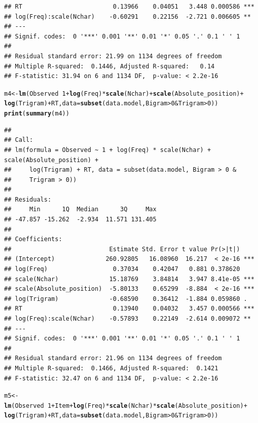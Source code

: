 \documentclass{article}\usepackage[]{graphicx}\usepackage[]{color}
\makeatletter
\newcommand{\hlnum}[1]{\textcolor[rgb]{0.686,0.059,0.569}{#1}}%
\newcommand{\hlopt}[1]{\textcolor[rgb]{0,0,0}{#1}}%
\newcommand{\hlstd}[1]{\textcolor[rgb]{0.345,0.345,0.345}{#1}}%
\newcommand{\hlkwb}[1]{\textcolor[rgb]{0.69,0.353,0.396}{#1}}%
\newcommand{\hlkwc}[1]{\textcolor[rgb]{0.333,0.667,0.333}{#1}}%
\newcommand{\hlkwd}[1]{\textcolor[rgb]{0.737,0.353,0.396}{\textbf{#1}}}%
\newenvironment{kframe}{%
 \def\at@end@of@kframe{}%
 \ifinner\ifhmode%
  \def\at@end@of@kframe{\end{minipage}}%
  \begin{minipage}{\columnwidth}%
 \fi\fi%
 \def\FrameCommand##1{\hskip\@totalleftmargin \hskip-\fboxsep
 \colorbox{shadecolor}{##1}\hskip-\fboxsep
     \hskip-\linewidth \hskip-\@totalleftmargin \hskip\columnwidth}%
 \MakeFramed {\advance\hsize-\width
   \@totalleftmargin\z@ \linewidth\hsize
   \@setminipage}}%
 {\par\unskip\endMakeFramed%
 \at@end@of@kframe}
\newenvironment{knitrout}{}{} %
\makeatother
\begin{document}
\begin{knitrout}
\begin{kframe}
\begin{verbatim}
## RT                         0.13966    0.04051   3.448 0.000586 ***
## log(Freq):scale(Nchar)    -0.60291    0.22156  -2.721 0.006605 ** 
## ---
## Signif. codes:  0 '***' 0.001 '**' 0.01 '*' 0.05 '.' 0.1 ' ' 1
## 
## Residual standard error: 21.99 on 1134 degrees of freedom
## Multiple R-squared:  0.1446,	Adjusted R-squared:   0.14 
## F-statistic: 31.94 on 6 and 1134 DF,  p-value: < 2.2e-16
\end{verbatim}
\begin{alltt}
\hlstd{m4} \hlkwb{<-} \hlkwd{lm}\hlstd{(Observed} \hlopt{~} \hlnum{1} \hlopt{+} \hlkwd{log}\hlstd{(Freq)} \hlopt{*} \hlkwd{scale}\hlstd{(Nchar)} \hlopt{+} \hlkwd{scale}\hlstd{(Absolute_position)} \hlopt{+}
    \hlkwd{log}\hlstd{(Trigram)} \hlopt{+} \hlstd{RT,} \hlkwc{data} \hlstd{=} \hlkwd{subset}\hlstd{(data.model, Bigram} \hlopt{>} \hlnum{0} \hlopt{&} \hlstd{Trigram} \hlopt{>} \hlnum{0}\hlstd{))}
\hlkwd{print}\hlstd{(}\hlkwd{summary}\hlstd{(m4))}
\end{alltt}
\begin{verbatim}
## 
## Call:
## lm(formula = Observed ~ 1 + log(Freq) * scale(Nchar) + scale(Absolute_position) + 
##     log(Trigram) + RT, data = subset(data.model, Bigram > 0 & 
##     Trigram > 0))
## 
## Residuals:
##     Min      1Q  Median      3Q     Max 
## -47.857 -15.262  -2.934  11.571 131.405 
## 
## Coefficients:
##                           Estimate Std. Error t value Pr(>|t|)    
## (Intercept)              260.92805   16.08960  16.217  < 2e-16 ***
## log(Freq)                  0.37034    0.42047   0.881 0.378620    
## scale(Nchar)              15.18769    3.84814   3.947 8.41e-05 ***
## scale(Absolute_position)  -5.80133    0.65299  -8.884  < 2e-16 ***
## log(Trigram)              -0.68590    0.36412  -1.884 0.059860 .  
## RT                         0.13940    0.04032   3.457 0.000566 ***
## log(Freq):scale(Nchar)    -0.57893    0.22149  -2.614 0.009072 ** 
## ---
## Signif. codes:  0 '***' 0.001 '**' 0.01 '*' 0.05 '.' 0.1 ' ' 1
## 
## Residual standard error: 21.96 on 1134 degrees of freedom
## Multiple R-squared:  0.1466,	Adjusted R-squared:  0.1421 
## F-statistic: 32.47 on 6 and 1134 DF,  p-value: < 2.2e-16
\end{verbatim}
\begin{alltt}
\hlstd{m5} \hlkwb{<-} \hlkwd{lm}\hlstd{(Observed} \hlopt{~} \hlnum{1} \hlopt{+} \hlstd{Item} \hlopt{+} \hlkwd{log}\hlstd{(Freq)} \hlopt{*} \hlkwd{scale}\hlstd{(Nchar)} \hlopt{*} \hlkwd{scale}\hlstd{(Absolute_position)} \hlopt{+}
    \hlkwd{log}\hlstd{(Trigram)} \hlopt{+} \hlstd{RT,} \hlkwc{data} \hlstd{=} \hlkwd{subset}\hlstd{(data.model, Bigram} \hlopt{>} \hlnum{0} \hlopt{&} \hlstd{Trigram} \hlopt{>} \hlnum{0}\hlstd{))}

\end{alltt}
\end{kframe}
\end{knitrout}
\end{document}
